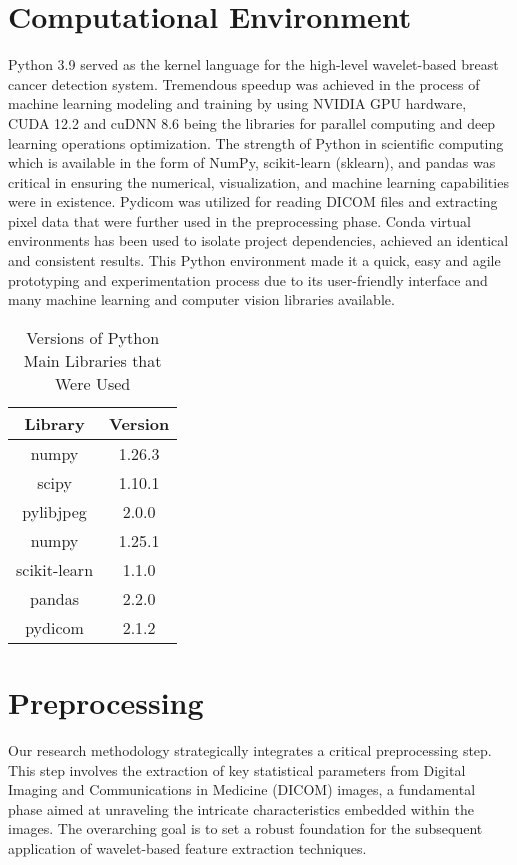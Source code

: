 \section{Computational Environment}
Python 3.9 served as the kernel language for the high-level wavelet-based breast cancer detection system. Tremendous speedup was achieved in the process of machine learning modeling and training by using NVIDIA GPU hardware, CUDA 12.2 and cuDNN 8.6 being the libraries for parallel computing and deep learning operations optimization. The strength of Python in scientific computing which is available in the form of NumPy, scikit-learn (sklearn), and pandas was critical in ensuring the numerical, visualization, and machine learning capabilities were in existence. Pydicom was utilized for reading DICOM files and extracting pixel data that were further used in the preprocessing phase. Conda virtual environments has been used to isolate project dependencies, achieved an identical and consistent results. This Python environment made it a quick, easy and agile prototyping and experimentation process due to its user-friendly interface and many machine learning and computer vision libraries available.
\begin{table}[htbp]
  \centering
  \caption{Versions of Python Main Libraries that Were Used}
  \begin{tabular}{|c|c|}
    \hline
    Library & Version \\
    \hline
    numpy & 1.26.3 \\
    scipy & 1.10.1 \\
    pylibjpeg & 2.0.0 \\
    numpy & 1.25.1 \\
    scikit-learn & 1.1.0 \\
    pandas & 2.2.0 \\
    pydicom & 2.1.2 \\
    \hline
  \end{tabular}
\end{table}
\section{Preprocessing}
Our research methodology strategically integrates a critical preprocessing step. This step involves the extraction of key statistical parameters from Digital Imaging and Communications in Medicine (DICOM) images, a fundamental phase aimed at unraveling the intricate characteristics embedded within the images. The overarching goal is to set a robust foundation for the subsequent application of wavelet-based feature extraction techniques.
